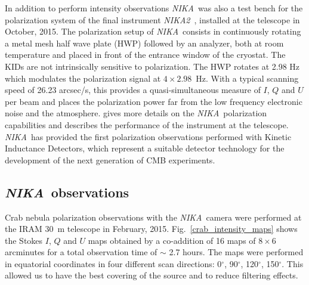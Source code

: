 \documentclass[twocolumn,traditabstract]{aa}
\def\NIKA{\textit{NIKA}}
\def\NIKAd{\textit{NIKA2}}
\begin{document}
In addition to perform intensity observations \NIKA\ was also a test bench for
the polarization system of the final instrument \NIKAd\
\citep{calvo2016,2016arXiv160508628C}, installed at the telescope in October, 2015. The polarization setup of \NIKA\ consists in continuously rotating a metal mesh half
wave plate (HWP) followed by an analyzer, both at room temperature and
  placed in front of the entrance window of the cryostat. The KIDs are not
  intrinsically sensitive to polarization. The HWP rotates at 2.98 Hz which
  modulates the polarization signal at $4\times 2.98$~Hz. With a typical scanning
  speed of 26.23 arcsec/s, this provides a quasi-simultaneous measure of $I$,
  $Q$ and $U$ per beam and places the polarization power far from the low
  frequency electronic noise and the atmosphere. \cite{ritacco2017} gives more
details on the \NIKA\ polarization capabilities and describes the performance of
the instrument at the telescope.  \NIKA\ has provided the first polarization
observations performed with Kinetic Inductance Detectors, which represent a
suitable detector technology for the development of the next generation of CMB
experiments.

\subsection{\NIKA\ observations}\label{sec:nika_observations}
Crab nebula polarization observations with the \NIKA\ camera were performed at
the IRAM 30~m telescope in February, 2015. Fig.~\ref{crab_intensity_maps} shows
the Stokes $I$, $Q$ and $U$ maps obtained by a co-addition of 16 maps
of $8 \times 6$ arcminutes for a total observation time of $\sim$ 2.7 hours. The
maps were performed in equatorial coordinates in four different scan
directions: 0$^{\circ}$, 90$^{\circ}$, 120$^{\circ}$, 150$^{\circ}$. This
allowed us to have the best covering of the source and to reduce filtering
effects.
\end{document}

